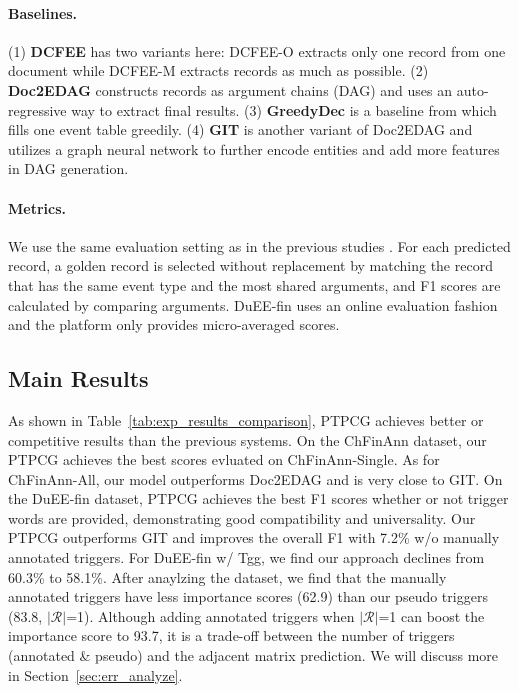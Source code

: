 \paragraph{Baselines.}
(1) \textbf{DCFEE} \cite{yang-etal-2018-dcfee} has two variants here: DCFEE-O extracts only one record from one document while DCFEE-M extracts records as much as possible.
(2) \textbf{Doc2EDAG} \cite{zheng-etal-2019-doc2edag} constructs records as argument chains (DAG) and uses an auto-regressive way to extract final results.
(3) \textbf{GreedyDec} is a baseline from \citet{zheng-etal-2019-doc2edag} which fills one event table greedily.
(4) \textbf{GIT} \cite{xu-etal-2021-git} is another variant of Doc2EDAG and utilizes a graph neural network to further encode entities and add more features in DAG generation.

\paragraph{Metrics.}
We use the same evaluation setting as in the previous studies \cite{zheng-etal-2019-doc2edag,xu-etal-2021-git}.
For each predicted record, a golden record is selected without replacement by matching the record that has the same event type and the most shared arguments, and F1 scores are calculated by comparing arguments.
DuEE-fin uses an online evaluation fashion and the platform only provides micro-averaged scores.


\subsection{Main Results}

As shown in Table~\ref{tab:exp_results_comparison}, PTPCG achieves better or competitive results than the previous systems.
On the ChFinAnn dataset, our PTPCG achieves the best scores evluated on ChFinAnn-Single.
As for ChFinAnn-All, our model outperforms Doc2EDAG and is very close to GIT.
On the DuEE-fin dataset, PTPCG achieves the best F1 scores whether or not trigger words are provided, demonstrating good compatibility and universality.
Our PTPCG outperforms GIT and improves the overall F1 with 7.2\% w/o manually annotated triggers.
For DuEE-fin w/ Tgg, we find our approach declines from 60.3\% to 58.1\%.
After anaylzing the dataset, we find that the manually annotated triggers have less importance scores (62.9) than our pseudo triggers (83.8, $|\mathcal{R}|$=1).
Although adding annotated triggers when $|\mathcal{R}|$=1 can boost the importance score to 93.7, it is a trade-off between the number of triggers (annotated \& pseudo) and the adjacent matrix prediction.
We will discuss more in Section~\ref{sec:err_analyze}.

